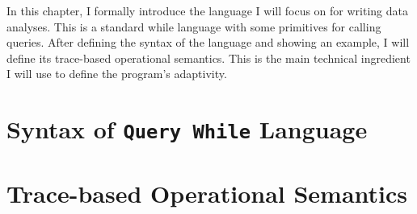 In this chapter, 
I formally introduce the language I will focus on for writing data analyses.  
This is a standard while language with some primitives for calling queries. 
After defining the syntax of the language and showing an example, 
I will define its trace-based operational semantics. 
This is the main technical ingredient I will use to define the program's adaptivity.
\section{Syntax of {\tt Query While} Language}
\label{sec:language-syntax}

\section{Trace-based Operational Semantics}
\label{sec:language-os}

